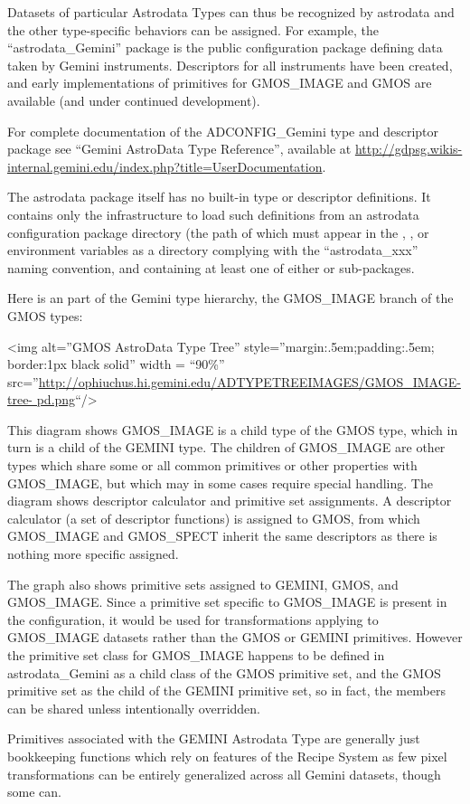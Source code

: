 \documentclass[letterpaper,10pt,english]{sphinxmanual}
\begin{document}
Datasets of particular Astrodata Types can thus
be recognized by astrodata and the other type-specific behaviors can
be assigned. For example, the ``astrodata\_Gemini'' package is the public
configuration package defining data taken by Gemini instruments.
Descriptors for all instruments have been created, and early
implementations of primitives for GMOS\_IMAGE and GMOS are available
(and under continued development).

For complete documentation of the ADCONFIG\_Gemini type and descriptor
package see ``Gemini AstroData Type Reference'', available at
\href{http://gdpsg.wikis-internal.gemini.edu/index.php?title=UserDocumentation}{http://gdpsg.wikis-
internal.gemini.edu/index.php?title=UserDocumentation}.

The astrodata package itself has no built-in type or descriptor
definitions. It contains only the infrastructure to load such
definitions from an astrodata configuration package directory (the
path of which must appear in the , , or
 environment variables as a directory complying with
the ``astrodata\_xxx'' naming convention, and containing at least one of
either  or  sub-packages.

Here is an part of the Gemini type hierarchy, the GMOS\_IMAGE branch of
the GMOS types:

\textless{}img alt=''GMOS AstroData Type Tree'' style=''margin:.5em;padding:.5em;
border:1px black solid'' width = ``90\%''
src=''\href{http://ophiuchus.hi.gemini.edu/ADTYPETREEIMAGES/GMOS\_IMAGE-tree-pd.png}{http://ophiuchus.hi.gemini.edu/ADTYPETREEIMAGES/GMOS\_IMAGE-tree-
pd.png}``/\textgreater{}

This diagram shows GMOS\_IMAGE is a child type of the GMOS type, which
in turn is a child of the GEMINI type. The children of GMOS\_IMAGE are
other types which share some or all common primitives or other
properties with GMOS\_IMAGE, but which may in some cases require
special handling. The diagram shows descriptor calculator and
primitive set assignments. A descriptor calculator (a set of
descriptor functions) is assigned to GMOS, from which GMOS\_IMAGE and
GMOS\_SPECT inherit the same descriptors as there is nothing more
specific assigned.

The graph also shows primitive sets assigned to GEMINI, GMOS, and
GMOS\_IMAGE. Since a primitive set specific to GMOS\_IMAGE is present in
the configuration, it would be used for transformations applying to
GMOS\_IMAGE datasets rather than the GMOS or GEMINI primitives. However
the primitive set class for GMOS\_IMAGE happens to be defined in
astrodata\_Gemini as a child class of the GMOS primitive set, and the
GMOS primitive set as the child of the GEMINI primitive set, so in
fact, the members can be shared unless intentionally overridden.

Primitives associated with the GEMINI Astrodata Type are generally
just bookkeeping functions which rely on features of the Recipe System
as few pixel transformations can be entirely generalized across all
Gemini datasets, though some can.



\renewcommand{\indexname}{Index}
\printindex
\end{document}
